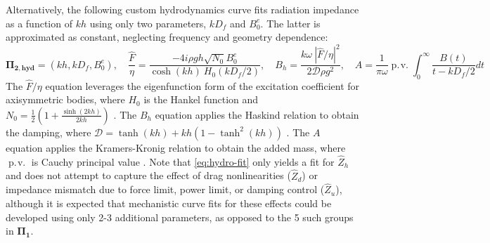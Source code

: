 \documentclass[10pt,twoside]{article}
\begin{document}
Alternatively, the following custom hydrodynamics curve fits radiation impedance as a function of $kh$ using only two parameters, $kD_f$ and $B_0^e$. The latter is approximated as constant, neglecting frequency and geometry dependence:
\begin{equation}\label{eq:hydro-fit}
    \mathbf{\Pi_{2,hyd}} = (kh, kD_f, B_0^e),
    \quad
    \frac{\hat{F}}{\eta} = \frac{-4i\rho g h \sqrt{N_0}B_0^e}{\cosh(kh)~H_0(kD_f/2)},
    \quad
    B_h = \frac{k \omega~ |\hat{F}/\eta|^2}{2 \mathcal{D} \rho g^2},
    \quad
    A = \frac{1}{\pi \omega} \displaystyle \operatorname {p.\!v.}\int_0^\infty \frac{B(t)}{t-kD_f/2} dt
\end{equation}
The $\hat{F}/\eta$ equation leverages the eigenfunction form of the excitation coefficient for axisymmetric bodies, where $H_0$ is the Hankel function and $N_0=\frac{1}{2}\left(1+\frac{\sinh(2kh)}{2kh}  \right)$ \cite{chau_inertia_2012}.
The $B_h$ equation applies the Haskind relation to obtain the damping, where $\mathcal{D}=\tanh(kh)+kh(1-\tanh^2(kh))$ \cite{chau_inertia_2012}.
The $A$ equation applies the Kramers-Kronig relation to obtain the added mass, where $\operatorname {p.\!v.}$ is Cauchy principal value \cite{greenhow_added_1988}.
Note that \eqref{eq:hydro-fit} only yields a fit for $\hat{Z}_h$ and does not attempt to capture the effect of drag nonlinearities ($\hat{Z}_d$) or impedance mismatch due to force limit, power limit, or damping control ($\hat{Z}_u$), although it is expected that mechanistic curve fits for these effects could be developed using only 2-3 additional parameters, as opposed to the 5 such groups in $\mathbf{\Pi_1}$.
\end{document}
